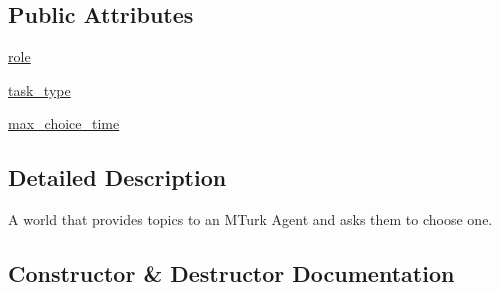 \subsection*{Public Attributes}
\begin{DoxyCompactItemize}
\item 
\hyperlink{classprojects_1_1wizard__of__wikipedia_1_1mturk__evaluation__task_1_1worlds_1_1TopicChooseWorld_a2eb6c10647cb8207bfa083ef0a493d13}{role}
\item 
\hyperlink{classprojects_1_1wizard__of__wikipedia_1_1mturk__evaluation__task_1_1worlds_1_1TopicChooseWorld_a71ae18a662941ea82999f48817e1c784}{task\+\_\+type}
\item 
\hyperlink{classprojects_1_1wizard__of__wikipedia_1_1mturk__evaluation__task_1_1worlds_1_1TopicChooseWorld_ac951b666993c2d306f11a50d30fe2ed1}{max\+\_\+choice\+\_\+time}
\end{DoxyCompactItemize}


\subsection{Detailed Description}
\begin{DoxyVerb}A world that provides topics to an MTurk Agent and asks them to choose one.
\end{DoxyVerb}
 

\subsection{Constructor \& Destructor Documentation}
\mbox{\label{classprojects_1_1wizard__of__wikipedia_1_1mturk__evaluation__task_1_1worlds_1_1TopicChooseWorld_a0c6930dd70c72544112407d55c0422ce}} 
